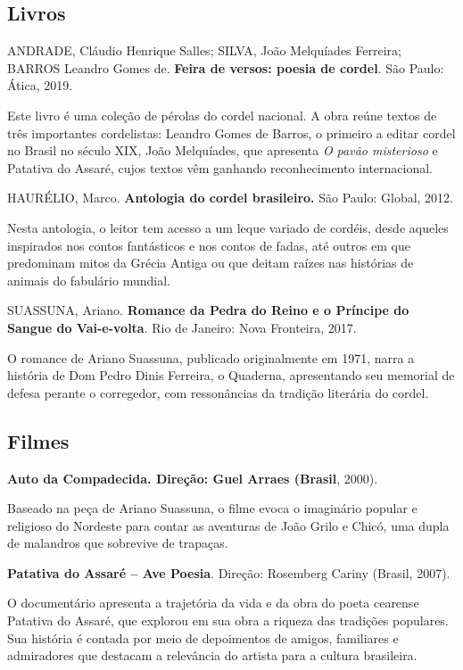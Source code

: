 \documentclass{extarticle}
\begin{document}
\subsection{Livros}

  ANDRADE, Cláudio Henrique Salles; SILVA, João Melquíades Ferreira;
  BARROS Leandro Gomes de. \textbf{Feira de versos: poesia de cordel}.
  São Paulo: Ática, 2019.

Este livro é uma coleção de pérolas do cordel nacional. A obra reúne
textos de três importantes cordelistas: Leandro Gomes de Barros, o
primeiro a editar cordel no Brasil no século XIX, João Melquíades, que
apresenta \emph{O pavão misterioso} e Patativa do Assaré, cujos textos
vêm ganhando reconhecimento internacional.


  HAURÉLIO, Marco. \textbf{Antologia do cordel brasileiro.} São Paulo:
  Global, 2012.

Nesta antologia, o leitor tem acesso a um leque variado de cordéis,
desde aqueles inspirados nos contos fantásticos e nos contos de fadas,
até outros em que predominam mitos da Grécia Antiga ou que deitam raízes
nas histórias de animais do fabulário mundial.


  SUASSUNA, Ariano. \textbf{Romance da Pedra do Reino e o Príncipe do
  Sangue do Vai-e-volta}. Rio de Janeiro: Nova Fronteira, 2017.

O romance de Ariano Suassuna, publicado originalmente em 1971, narra a
história de Dom Pedro Dinis Ferreira, o Quaderna, apresentando seu
memorial de defesa perante o corregedor, com ressonâncias da tradição
literária do cordel.


\subsection{Filmes}

  \textbf{Auto da Compadecida. Direção: Guel Arraes (Brasil}, 2000).

Baseado na peça de Ariano Suassuna, o filme evoca o imaginário popular e
religioso do Nordeste para contar as aventuras de João Grilo e Chicó,
uma dupla de malandros que sobrevive de trapaças.


  \textbf{Patativa do Assaré -- Ave Poesia}. Direção: Rosemberg Cariny
  (Brasil, 2007).

O documentário apresenta a trajetória da vida e da obra do poeta
cearense Patativa do Assaré, que explorou em sua obra a riqueza das
tradições populares. Sua história é contada por meio de depoimentos de
amigos, familiares e admiradores que destacam a relevância do artista
para a cultura brasileira.
\end{document}

